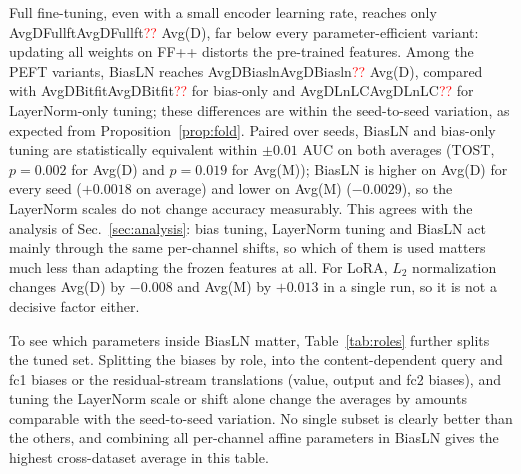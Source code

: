 \documentclass[fonts]{icst}
\newif\ifrevmark\revmarktrue
\newcommand{\rev}[1]{\ifrevmark{\color{revblue}#1}\else#1\fi}
\newenvironment{revblock}{\ifrevmark\color{revblue}\fi}{}
\newcommand{\num}[1]{\ifcsname #1\endcsname\csname #1\endcsname\else\textcolor{red}{??}\fi}
\begin{document}
\begin{revblock}
Full fine-tuning, even with a small encoder learning rate, reaches only \num{AvgDFullft} Avg(D), far below every parameter-efficient variant: updating all weights on FF++ distorts the pre-trained features. Among the PEFT variants, BiasLN reaches \num{AvgDBiasln} Avg(D), compared with \num{AvgDBitfit} for bias-only and \num{AvgDLnLC} for LayerNorm-only tuning; these differences are within the seed-to-seed variation, as expected from Proposition~\ref{prop:fold}. Paired over seeds, BiasLN and bias-only tuning are statistically equivalent within $\pm0.01$ AUC on both averages (TOST, $p=0.002$ for Avg(D) and $p=0.019$ for Avg(M)); BiasLN is higher on Avg(D) for every seed ($+0.0018$ on average) and lower on Avg(M) ($-0.0029$), so the LayerNorm scales do not change accuracy measurably. This agrees with the analysis of Sec.~\ref{sec:analysis}: bias tuning, LayerNorm tuning and BiasLN act mainly through the same per-channel shifts, so which of them is used matters much less than adapting the frozen features at all. For LoRA, $L_2$ normalization changes Avg(D) by $-0.008$ and Avg(M) by $+0.013$ in a single run, so it is not a decisive factor either.

To see which parameters inside BiasLN matter, Table~\ref{tab:roles} further splits the tuned set. Splitting the biases by role, into the content-dependent query and fc1 biases or the residual-stream translations (value, output and fc2 biases), and tuning the LayerNorm scale or shift alone change the averages by amounts comparable with the seed-to-seed variation. No single subset is clearly better than the others, and combining all per-channel affine parameters in BiasLN gives the highest cross-dataset average in this table.
\end{revblock}

\begin{table}[H]
\centering
\captionsetup{labelsep=period, labelfont=bf, hypcap=false}
\caption{\rev{Which parameters inside BiasLN to tune ($L_2$ normalization, cross-entropy). Only the tuned subset of the encoder differs. Video AUC, mean $\pm$ std over $n$ seeds.}}
\label{tab:roles}
\resizebox{\columnwidth}{!}{}
\end{table}
\end{document}
